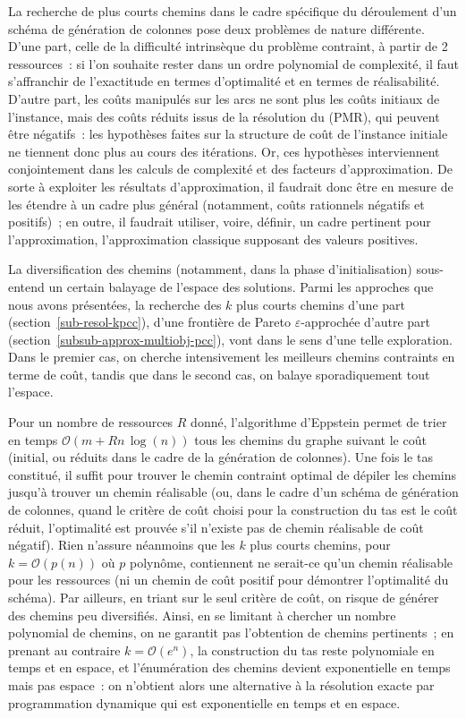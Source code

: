 \documentclass[10pt,francais]{llncs}
\begin{document}
{La recherche de plus courts chemins dans le cadre sp\'ecifique du d\'eroulement d'un sch\'ema de g\'en\'eration de colonnes pose deux probl\`emes de nature diff\'erente. D'une part, celle de la difficult\'e intrins\`eque du probl\`eme contraint, \`a partir de 2 ressources~: si l'on souhaite rester dans un ordre polynomial de complexit\'e, il faut s'affranchir de l'exactitude en termes d'optimalit\'e et en termes de r\'ealisabilit\'e. D'autre part, les co\^uts manipul\'es sur les arcs ne sont plus les co\^uts initiaux de l'instance, mais des co\^uts r\'eduits issus de la r\'esolution du (PMR), qui peuvent \^etre n\'egatifs~: les hypoth\`eses faites sur la structure de co\^ut de l'instance initiale ne tiennent donc plus au cours des it\'erations. Or, ces hypoth\`eses interviennent conjointement dans les calculs de complexit\'e et des facteurs d'approximation. De sorte \`a exploiter les r\'esultats d'approximation, il faudrait donc \^etre en mesure de les \'etendre \`a un cadre plus g\'en\'eral (notamment, co\^uts rationnels n\'egatifs et positifs)~; en outre, il faudrait utiliser, voire, d\'efinir, un cadre pertinent pour l'approximation, l'approximation classique supposant des valeurs positives.

La diversification des chemins (notamment, dans la phase d'initialisation) sous-entend un certain balayage de l'espace des solutions. Parmi les approches que nous avons pr\'esent\'ees, la recherche des $k$ plus courts chemins d'une part (section~\ref{sub-resol-kpcc}), d'une fronti\`ere de Pareto $\varepsilon$-approch\'ee d'autre part (section~\ref{subsub-approx-multiobj-pcc}), vont dans le sens d'une telle exploration. Dans le premier cas, on cherche intensivement les meilleurs chemins contraints en terme de co\^ ut, tandis que dans le second cas, on balaye sporadiquement tout l'espace.

Pour un nombre de ressources $R$ donn\'e, l'algorithme d'Eppstein permet de trier en temps $\mathcal{O}(m + Rn\, \log(n))$ tous les chemins du graphe suivant le co\^ut (initial, ou r\'eduits dans le cadre de la g\'en\'eration de colonnes). Une fois le tas constitu\'e, il suffit pour trouver le chemin contraint optimal de d\'epiler les chemins jusqu'\`a trouver un chemin r\'ealisable (ou, dans le cadre d'un sch\'ema de g\'en\'eration de colonnes, quand le crit\`ere de co\^ut choisi pour la construction du tas est le co\^ut r\'eduit, l'optimalit\'e est prouv\'ee s'il n'existe pas de chemin r\'ealisable de co\^ut n\'egatif). Rien n'assure n\'eanmoins que les $k$ plus courts chemins, pour $k=\mathcal{O}(p(n))$ o\`u $p$ polyn\^ome, contiennent ne serait-ce qu'un chemin r\'ealisable pour les ressources (ni un chemin de co\^ut positif pour d\'emontrer l'optimalit\'e du sch\'ema). Par ailleurs, en triant sur le seul crit\`ere de co\^ut, on risque de g\'en\'erer des chemins peu diversifi\'es. Ainsi, en se limitant \`a chercher un nombre polynomial de chemins, on ne garantit pas l'obtention de chemins pertinents~; en prenant au contraire $k=\mathcal{O}(e^n)$, la construction du tas reste polynomiale en temps et en espace, et l'\'enum\'eration des chemins devient exponentielle en temps mais pas espace~: on n'obtient alors une alternative \`a la r\'esolution exacte par programmation dynamique qui est exponentielle en temps et en espace.

}
\end{document}
